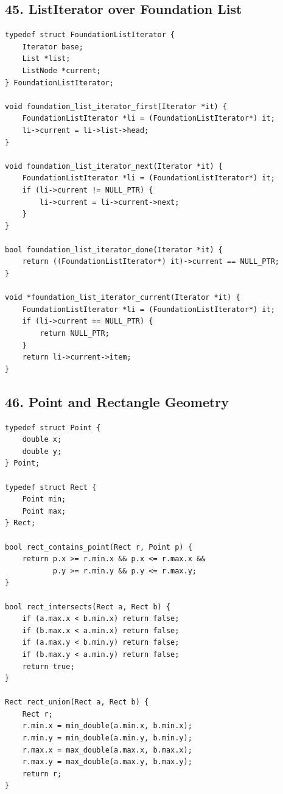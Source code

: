 \documentclass[11pt]{article}
\begin{document}
\subsection{45. ListIterator over Foundation List}\label{listiterator-over-foundation-list}

\begin{verbatim}
typedef struct FoundationListIterator {
    Iterator base;
    List *list;
    ListNode *current;
} FoundationListIterator;

void foundation_list_iterator_first(Iterator *it) {
    FoundationListIterator *li = (FoundationListIterator*) it;
    li->current = li->list->head;
}

void foundation_list_iterator_next(Iterator *it) {
    FoundationListIterator *li = (FoundationListIterator*) it;
    if (li->current != NULL_PTR) {
        li->current = li->current->next;
    }
}

bool foundation_list_iterator_done(Iterator *it) {
    return ((FoundationListIterator*) it)->current == NULL_PTR;
}

void *foundation_list_iterator_current(Iterator *it) {
    FoundationListIterator *li = (FoundationListIterator*) it;
    if (li->current == NULL_PTR) {
        return NULL_PTR;
    }
    return li->current->item;
}
\end{verbatim}

\subsection{46. Point and Rectangle Geometry}\label{point-and-rectangle-geometry}

\begin{verbatim}
typedef struct Point {
    double x;
    double y;
} Point;

typedef struct Rect {
    Point min;
    Point max;
} Rect;

bool rect_contains_point(Rect r, Point p) {
    return p.x >= r.min.x && p.x <= r.max.x &&
           p.y >= r.min.y && p.y <= r.max.y;
}

bool rect_intersects(Rect a, Rect b) {
    if (a.max.x < b.min.x) return false;
    if (b.max.x < a.min.x) return false;
    if (a.max.y < b.min.y) return false;
    if (b.max.y < a.min.y) return false;
    return true;
}

Rect rect_union(Rect a, Rect b) {
    Rect r;
    r.min.x = min_double(a.min.x, b.min.x);
    r.min.y = min_double(a.min.y, b.min.y);
    r.max.x = max_double(a.max.x, b.max.x);
    r.max.y = max_double(a.max.y, b.max.y);
    return r;
}
\end{verbatim}
\end{document}
